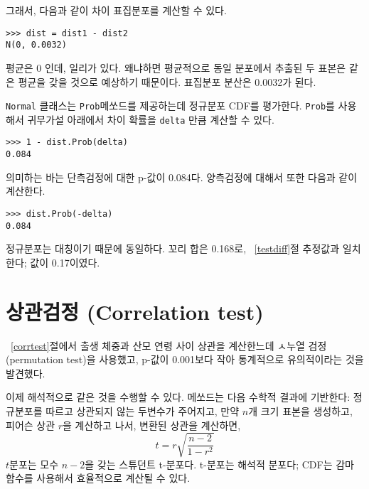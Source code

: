 그래서, 다음과 같이 차이 표집분포를 계산할 수 있다.

\begin{verbatim}
>>> dist = dist1 - dist2
N(0, 0.0032)
\end{verbatim}

평균은 0 인데, 일리가 있다. 왜냐하면 평균적으로 동일 분포에서 추출된 두 표본은 같은 평균을 갖을 것으로 예상하기 때문이다. 표집분포 분산은 0.0032가 된다.

{\tt Normal} 클래스는 {\tt Prob}메쏘드를 제공하는데 정규분포 CDF를 평가한다. {\tt Prob}를 사용해서 귀무가설 아래에서 차이 확률을 {\tt delta} 만큼 계산할 수 있다.

\begin{verbatim}
>>> 1 - dist.Prob(delta)
0.084
\end{verbatim}

의미하는 바는 단측검정에 대한 p-값이 0.084다. 양측검정에 대해서 또한 다음과 같이 계산한다.

\begin{verbatim}
>>> dist.Prob(-delta)
0.084
\end{verbatim}

정규분포는 대칭이기 때문에 동일하다. 꼬리 합은 0.168로, ~\ref{testdiff}절 추정값과 일치한다; 값이 0.17이였다.



\section{상관검정 (Correlation test)}

~\ref{corrtest}절에서 출생 체중과 산모 연령 사이 상관을 계산한느데 ㅅ누열 검정(permutation test)을 사용했고, p-값이 0.001보다 작아 통계적으로 유의적이라는 것을 발견했다.

이제 해석적으로 같은 것을 수행할 수 있다.
메쏘드는 다음 수학적 결과에 기반한다: 정규분포를 따르고 상관되지 않는 두변수가 주어지고, 만약 $n$개 크기 표본을 생성하고, 피어슨 상관 $r$을 계산하고 나서, 변환된 상관을 계산하면, 
%
\[ t = r \sqrt{\frac{n-2}{1-r^2}} \]
%
$t$분포는 모수 $n-2$을 갖는 스튜던트 t-분포다.
t-분포는 해석적 분포다; CDF는 감마 함수를 사용해서 효율적으로 계산될 수 있다.

